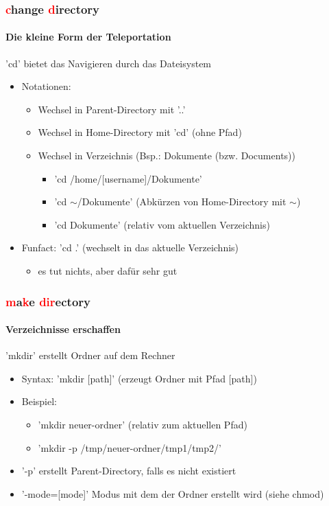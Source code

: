\documentclass[12pt,utf8, handout]{beamer}
\begin{document}
\begin{frame}
\frametitle{\textcolor{red}{c}hange \textcolor{red}{d}irectory}
\framesubtitle{\textcolor{ownDarkOr}{Die kleine Form der Teleportation}}
'cd' bietet das Navigieren durch das Dateisystem
\begin{itemize}[<+->]
	\item Notationen:	
	\begin{itemize}[<+->]
		\item Wechsel in Parent-Directory mit '..'
		\item Wechsel in Home-Directory mit 'cd'   (ohne Pfad)
		\item Wechsel in Verzeichnis (Bsp.: Dokumente (bzw. Documents))
		\begin{itemize}[<+->]
			\item 'cd /home/[username]/Dokumente'
			\item 'cd $\sim$/Dokumente'   (Abkürzen von Home-Directory mit $\sim$)
			\item 'cd Dokumente'    (relativ vom aktuellen Verzeichnis)
		\end{itemize}
	\end{itemize}
	\item Funfact: 'cd .'  (wechselt in das aktuelle Verzeichnis)
	\begin{itemize}
		\item es tut nichts, aber dafür sehr gut
	\end{itemize}
\end{itemize}
\end{frame}

\begin{frame}
\frametitle{\textcolor{red}{m}a\textcolor{red}{k}e \textcolor{red}{dir}ectory}
\framesubtitle{\textcolor{ownDarkOr}{Verzeichnisse erschaffen}}
'mkdir' erstellt Ordner auf dem Rechner
\begin{itemize}[<+->]
	\item Syntax: 'mkdir [path]'   (erzeugt Ordner mit Pfad [path])
	\item Beispiel:
	\begin{itemize}[<+->]
		\item 'mkdir neuer-ordner'    (relativ zum aktuellen Pfad)
		\item 'mkdir -p /tmp/neuer-ordner/tmp1/tmp2/'
	\end{itemize}
	\item '-p'   erstellt Parent-Directory, falls es nicht existiert
	\item '-mode=[mode]'  Modus mit dem der Ordner erstellt wird (siehe chmod)
\end{itemize}
\end{frame}
\end{document}
